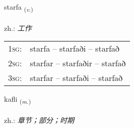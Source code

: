 \documentclass[frontgrid, backgrid]{flacards}\usepackage[]{graphicx}\usepackage[]{xcolor}
\begin{document}
{starfa \small{\textsubscript{(\textit{v.})}} \\[1ex] %
\textphonetic{[starva]} \\
zh.: \emph{工作} \\  [2ex]
\renewcommand*{\arraystretch}{0.8}
\begin{tabular}{p{1cm}l}
\textsc{1sg}: & starfa -- starfaði -- starfað \\ 
\textsc{2sg}: & starfar -- starfaðir -- starfað \\ 
\textsc{3sg}: & starfar -- starfaði -- starfað \\ 
\end{tabular}
}

\renewcommand{\flhead}{\vskip5pt \fboxsep=0pt {\small\bfseries\footnotesize Nafnorð | 名词}}
\renewcommand{\fcfoot}{\vskip5pt \fboxsep=0pt \hspace{2pt}{\small\bfseries\footnotesize 1K}}

\renewcommand{\blhead}{\vskip5pt {\small\bfseries\footnotesize Nafnorð | 名词 }}
\renewcommand{\bcfoot}{\vskip5pt \hspace{2pt}{\small\bfseries\footnotesize 1K}}


{kafli \small{\textsubscript{(\textit{m.})}} \\[1ex] %
\textphonetic{[kʰaplɪ]} \\
zh.: \emph{章节；部分；时期} \\  [2ex]
\renewcommand*{\arraystretch}{0.8}
}

\renewcommand{\flhead}{\vskip5pt \fboxsep=0pt {\small\bfseries\footnotesize Sagnorð | 动词}}
\renewcommand{\fcfoot}{\vskip5pt \fboxsep=0pt \hspace{2pt}{\small\bfseries\footnotesize 1K}}
\end{document}
